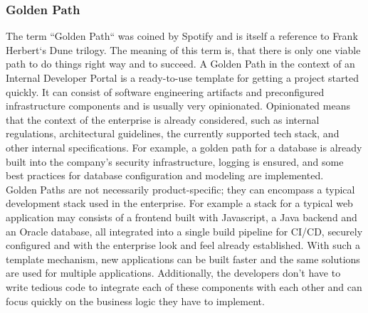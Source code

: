 \documentclass[a4paper,12pt]{article}
\begin{document}
    \subsubsection{Golden Path}
    \label{sssec:goldenpath}
    The term ``Golden Path`` was coined by Spotify\parencite{spotifygoldenpath} and is itself a reference to Frank
    Herbert`s Dune trilogy.
    The meaning of this term is, that there is only one viable path to do things right way and to succeed.
    A Golden Path in the context of an Internal Developer Portal is a ready-to-use template for getting a project
    started quickly.
    It can consist of software engineering artifacts and preconfigured infrastructure components and is usually very
    opinionated.
    Opinionated means that the context of the enterprise is already considered, such as internal regulations,
    architectural guidelines, the currently supported tech stack, and other internal specifications.
    For example, a golden path for a database is already built into the company's security infrastructure,
    logging is ensured, and some best practices for database configuration and modeling are implemented.\\
    Golden Paths are not necessarily product-specific;
    they can encompass a typical development stack used in the enterprise.
    For example a stack for a typical web application may consists of a frontend built with Javascript, a Java backend
    and an Oracle database, all integrated into a single build pipeline for CI/CD,    securely configured and with
    the enterprise look and feel already established.
    With such a template mechanism, new applications can be built faster and the same solutions are used for multiple
    applications.
    Additionally, the developers don't have to write tedious code to integrate each of these components with each other
    and can focus quickly on the business logic they have to implement.
\end{document}
